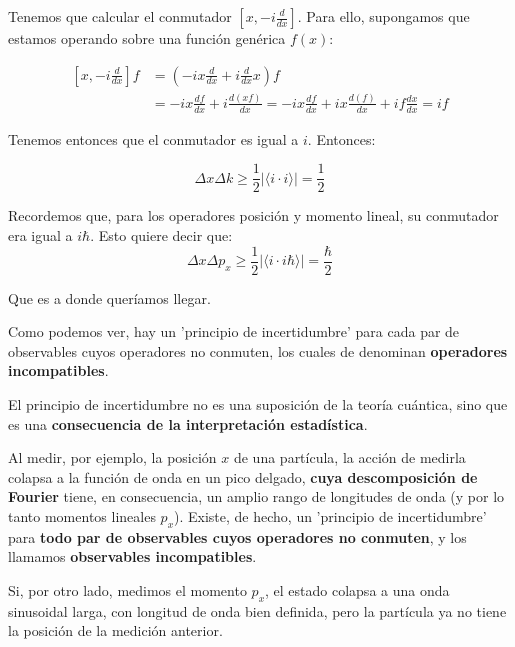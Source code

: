 Tenemos que calcular el conmutador $\left[x,-i\frac{d}{dx}\right]$. Para ello, supongamos que estamos operando sobre una función genérica $f(x)$:

\begin{equation}
 \begin{split}
    \left[x,-i\frac{d}{dx}\right]f&=\left(-ix\frac{d}{dx}+i\frac{d}{dx}x\right)f\\
    &=-ix\frac{df}{dx}+i\frac{d(xf)}{dx}= -ix\frac{df}{dx}+ix\frac{d(f)}{dx}+if\frac{dx}{dx}=if     
 \end{split}
\end{equation}

Tenemos entonces que el conmutador es igual a $i$. Entonces:

\begin{equation}
     \Delta x \Delta k \geq \frac{1}{2}|\langle i \cdot i \rangle|=\frac{1}{2} 
\end{equation}

\begin{marginfigure}
\begin{qbox}{}
    Recordemos que, para los operadores posición y momento lineal, su conmutador era igual a $i\hbar$. Esto quiere decir que:
    \begin{equation*}
    \Delta x \Delta p_x \geq \frac{1}{2}|\langle i \cdot i \hbar \rangle| = \frac{\hbar}{2}
    \end{equation*}
\end{qbox}
\end{marginfigure}

Que es a donde queríamos llegar.

Como podemos ver, hay un 'principio de incertidumbre' para cada par de observables cuyos operadores no conmuten, los cuales de denominan \textbf{operadores incompatibles}.

\vspace{0.5cm}
\begin{resultados}{}
    El principio de incertidumbre no es una suposición de la teoría cuántica, sino que es una \textbf{consecuencia de la interpretación estadística}.
\end{resultados}
\begin{resultados}{}
Al medir, por ejemplo, la posición $x$ de una partícula, la acción de medirla colapsa a la función de onda en un pico delgado, \textbf{cuya descomposición de Fourier} tiene, en consecuencia, un amplio rango de longitudes de onda (y por lo tanto momentos lineales $p_x$).
Existe, de hecho, un 'principio de incertidumbre' para \textbf{todo par de observables cuyos operadores no conmuten}, y los llamamos \textbf{observables incompatibles}.   
\end{resultados}
\begin{resultados}
Si, por otro lado, medimos el momento $p_x$, el estado colapsa a una onda sinusoidal larga, con longitud de onda bien definida, pero la partícula ya no tiene la posición de la medición anterior.
\end{resultados}
